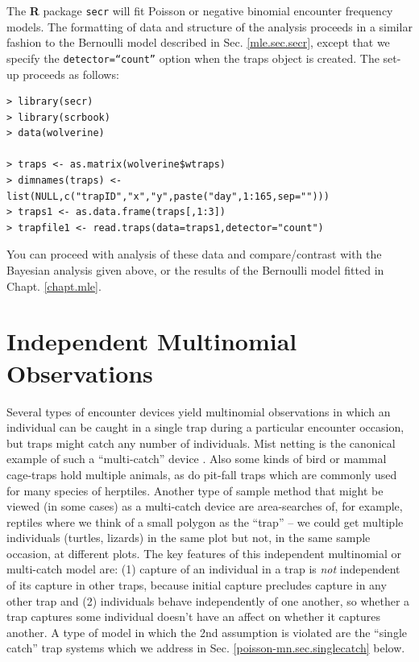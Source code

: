 The {\bf R} package \mbox{\tt secr} will fit Poisson or negative
binomial encounter frequency models. The formatting of data and
structure of the analysis proceeds in a similar fashion to the
Bernoulli model described in Sec. \ref{mle.sec.secr}, except that
we specify the \mbox{\tt detector=``count''} option when the traps
object is created. The set-up proceeds as follows:
\begin{samepage}
{\small
\begin{verbatim}
> library(secr)
> library(scrbook)
> data(wolverine)

> traps <- as.matrix(wolverine$wtraps)
> dimnames(traps) <- list(NULL,c("trapID","x","y",paste("day",1:165,sep="")))
> traps1 <- as.data.frame(traps[,1:3])
> trapfile1 <- read.traps(data=traps1,detector="count")
\end{verbatim}
}
\end{samepage}
You can proceed with analysis of these data and compare/contrast with
the Bayesian analysis given above, or the results of the Bernoulli
model fitted in Chapt. \ref{chapt.mle}.



\section{Independent Multinomial Observations}
\label{poisson-mn.sec.multinomial}

Several types of encounter devices yield multinomial observations in
which an individual can be caught in a single trap during a particular
encounter occasion, but traps might catch any number of individuals.
Mist netting is the canonical example of such a ``multi-catch'' device
\citep{efford_etal:2009euring}. Also some kinds of bird or mammal
cage-traps hold multiple animals, as do pit-fall traps which are
commonly used for many species of herptiles.  Another type of sample
method that might be viewed (in some cases) as a multi-catch device
are area-searches of, for example, reptiles where we think of a small
polygon as the ``trap'' -- we could get multiple individuals (turtles,
lizards) in the same plot but not, in the same sample occasion, at
different plots.  The key features of this independent multinomial or
multi-catch model are: (1) capture of an individual in a trap is {\it
  not} independent of its capture in other traps, because initial
capture precludes capture in any other trap and (2) individuals behave
independently of one another, so whether a trap captures some
individual doesn't have an affect on whether it captures another.  A
type of model in which the 2nd assumption is violated are the ``single
catch'' trap systems which we address in
Sec. \ref{poisson-mn.sec.singlecatch} below.



